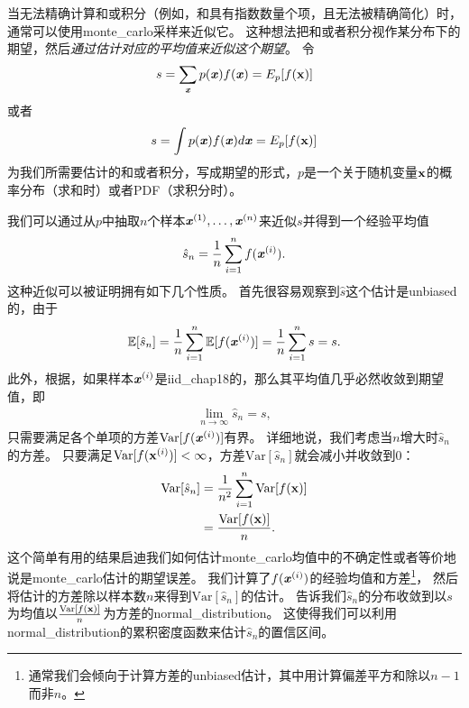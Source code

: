 当无法精确计算和或积分（例如，和具有指数数量个项，且无法被精确简化）时，通常可以使用\gls{monte_carlo}采样来近似它。
这种想法把和或者积分视作某分布下的期望，然后\emph{通过估计对应的平均值来近似这个期望}。
令
\begin{align}
s = \sum_{\boldsymbol{\mathit{x}}} p(\boldsymbol{\mathit{x}})f(\boldsymbol{\mathit{x}}) = E_p[f(\mathbf{x})]
\end{align}
或者
\begin{align}
\label{eqn:integra}
s = \int p(\boldsymbol{\mathit{x}})f(\boldsymbol{\mathit{x}})d\boldsymbol{\mathit{x}} = E_p[f(\mathbf{x})]
\end{align}
为我们所需要估计的和或者积分，写成期望的形式，$p$是一个关于随机变量$\mathbf{x}$的概率分布（求和时）或者\gls{PDF}（求积分时）。

我们可以通过从$p$中抽取$n$个样本$\boldsymbol{\mathit{x}}^{(1)},\ldots,\boldsymbol{\mathit{x}}^{(n)}$来近似$s$并得到一个经验平均值   
\begin{align}	
\hat{s}_n = \frac{1}{n}\sum_{i=1}^{n}f(\boldsymbol{\mathit{x}}^{(i)}).
\end{align}
这种近似可以被证明拥有如下几个性质。
首先很容易观察到$\hat{s}$这个估计是\gls{unbiased}的，由于
\begin{align}
\mathbb{E}[\hat{s}_n] = \frac{1}{n}\sum_{i=1}^{n}\mathbb{E}[f(\boldsymbol{\mathit{x}}^{(i)})] = \frac{1}{n}\sum_{i=1}^{n}s = s.
\end{align}
此外，根据，如果样本$\boldsymbol{\mathit{x}}^{(i)}$是\gls{iid_chap18}的，那么其平均值几乎必然收敛到期望值，即
\begin{align}
\lim_{n\xrightarrow{}\infty} \hat{s}_n = s,
\end{align}
只需要满足各个单项的方差$\text{Var}[f(\boldsymbol{\mathit{x}}^{(i)})]$有界。 
详细地说，我们考虑当$n$增大时$\hat{s}_n$的方差。
只要满足$\text{Var}[f(\mathbf{x}^{(i)})]<\infty$，方差$\text{Var}[\hat{s}_n]$就会减小并收敛到$0$：
\begin{align}
\text{Var}[\hat{s}_n] & = \frac{1}{n^2}\sum_{i=1}^{n}\text{Var}[f(\mathbf{x})]\\
&  = \frac{\text{Var}[f(\mathbf{x})]}{n}.
\end{align}
这个简单有用的结果启迪我们如何估计\gls{monte_carlo}均值中的不确定性或者等价地说是\gls{monte_carlo}估计的期望误差。 %
我们计算了$f(\boldsymbol{\mathit{x}}^{(i)})$的经验均值和方差\footnote{通常我们会倾向于计算方差的\gls{unbiased}估计，其中用计算偏差平方和除以$n-1$而非$n$。}， 
然后将估计的方差除以样本数$n$来得到$\text{Var}[\hat{s}_n]$的估计。
告诉我们$\hat{s}_n$的分布收敛到以$s$为均值以$\frac{\text{Var}[f(\mathbf{x})]}{n}$为方差的\gls{normal_distribution}。
这使得我们可以利用\gls{normal_distribution}的累积密度函数来估计$\hat{s}_n$的置信区间。



